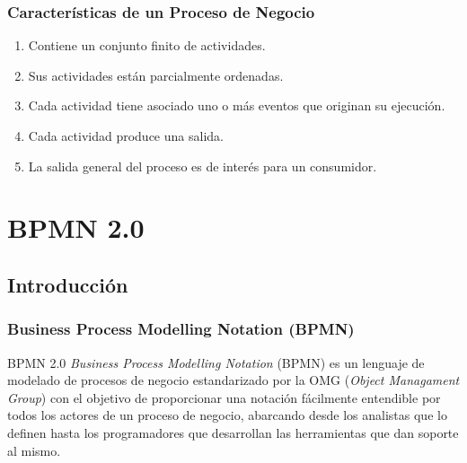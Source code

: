 \documentclass[a4paper,slidestop,xcolor=pst,blue]{beamer}
\begin{document}
\begin{frame}[c]
    \frametitle{Características de un Proceso de Negocio}
    \begin{enumerate}[<+->]
        \item Contiene un conjunto finito de actividades.
        \item Sus actividades están parcialmente ordenadas.
        \item Cada actividad tiene asociado uno o más eventos que originan su ejecución.
        \item Cada actividad produce una salida.
        \item La salida general del proceso es de interés para un consumidor.
    \end{enumerate}
\end{frame}


\section{BPMN 2.0}

\subsection{Introducción}

\begin{frame}[c]
    \frametitle{Business Process Modelling Notation (BPMN)}
    \begin{block}{BPMN 2.0}
        \emph{Business Process Modelling Notation} (BPMN) es un lenguaje de modelado de procesos de negocio estandarizado por la OMG (\emph{Object Managament Group}) con el objetivo de proporcionar una notación fácilmente entendible por todos los actores de un proceso de negocio, abarcando desde los analistas que lo definen hasta los programadores que desarrollan las herramientas que dan soporte al mismo.
    \end{block}
\end{frame}
\end{document}
